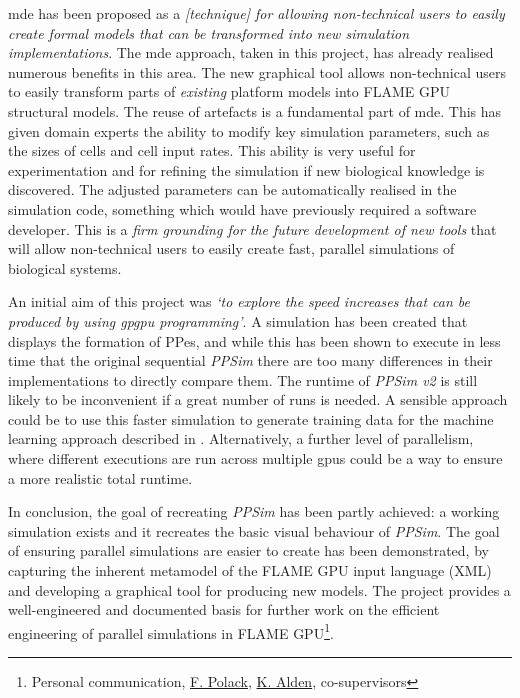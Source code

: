 \documentclass{UoYCSproject}
\begin{document}
\gls{mde} has been proposed as a \textit{[technique] for allowing non-technical users to easily create formal models that can be transformed into new simulation implementations}.
The \gls{mde} approach, taken in this project, has already realised numerous benefits in this area.
The new graphical tool allows non-technical users to easily transform parts of \textit{existing} platform models into \gls{FLAME GPU} structural models.
The reuse of artefacts is a fundamental part of \gls{mde}.
This has given domain experts the ability to modify key simulation parameters, such as the sizes of cells and cell input rates.
This ability is very useful for experimentation and for refining the simulation if new biological knowledge is discovered.
The adjusted parameters can be automatically realised in the simulation code, something which would have previously required a software developer.
This is a \textit{firm grounding for the future development of new tools} that will allow non-technical users to easily create fast, parallel simulations of biological systems.

An initial aim of this project was \textit{`to explore the speed increases that can be produced by using \gls{gpgpu} programming'}.
A simulation has been created that displays the formation of \gls{PP}es, and while this has been shown to execute in less time that the original sequential \textit{PPSim} there are too many differences in their implementations to directly compare them.
The runtime of \textit{PPSim v2} is still likely to be inconvenient if a great number of runs is needed.
A sensible approach could be to use this faster simulation to generate training data for the machine learning approach described in \cite{kieran_machine_learning}.
Alternatively, a further level of parallelism, where different executions are run across multiple \gls{gpu}s could be a way to ensure a more realistic total runtime.

In conclusion, the goal of recreating \textit{PPSim} has been partly achieved: a working simulation exists and it recreates the basic visual behaviour of \textit{PPSim}. 
The goal of ensuring parallel simulations are easier to create has been demonstrated, by capturing the inherent metamodel of the \gls{FLAME GPU} input language (XML) and developing a graphical tool for producing new models.
The project provides a well-engineered and documented basis for further work on the efficient engineering of parallel simulations in \gls{FLAME GPU}\footnote{Personal communication, \href{http://www.scm.keele.ac.uk/staff/f_polack/}{F. Polack}, \href{https://www.york.ac.uk/computational-immunology/members/kieran/}{K. Alden}, co-supervisors}.
\end{document}
